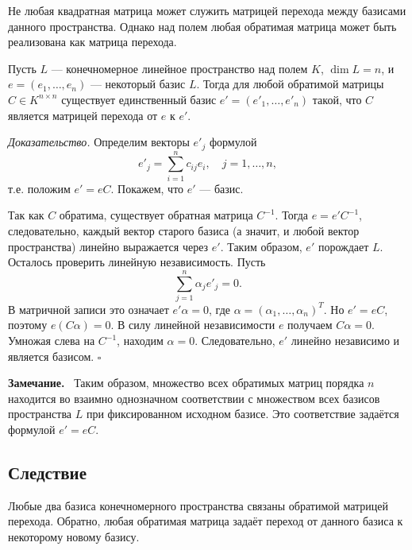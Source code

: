 \documentclass[a4paper,12pt]{article}
\newcommand{\myremark}{\textbf{Замечание.}\ }
\theoremstyle{definition}
\theoremstyle{plain}
\theoremstyle{remark}
\begin{document}
	Не любая квадратная матрица может служить матрицей перехода между базисами данного пространства. Однако над полем любая обратимая матрица может быть реализована как матрица перехода.
	
	\begin{tcolorbox}[colback=red!5, colframe=red!50!black, title=Теорема]
		Пусть \( L \) — конечномерное линейное пространство над полем \( K \), \( \dim L = n \), и \( e = (e_1, \dots, e_n) \) — некоторый базис \( L \). Тогда для любой обратимой матрицы \( C \in K^{n \times n} \) существует единственный базис \( e' = (e'_1, \dots, e'_n) \) такой, что \( C \) является матрицей перехода от \( e \) к \( e' \).
	\end{tcolorbox}
	
	\medskip
	\textit{Доказательство.}
	Определим векторы \( e'_j \) формулой
	\[
	e'_j = \sum_{i=1}^n c_{ij} e_i, \quad j = 1, \dots, n,
	\]
	т.е. положим \( e' = e C \). Покажем, что \( e' \) — базис.
	
	Так как \( C \) обратима, существует обратная матрица \( C^{-1} \). Тогда \( e = e' C^{-1} \), следовательно, каждый вектор старого базиса (а значит, и любой вектор пространства) линейно выражается через \( e' \). Таким образом, \( e' \) порождает \( L \). Осталось проверить линейную независимость. Пусть
	\[
	\sum_{j=1}^n \alpha_j e'_j = 0.
	\]
	В матричной записи это означает \( e' \alpha = 0 \), где \( \alpha = (\alpha_1, \dots, \alpha_n)^T \). Но \( e' = e C \), поэтому \( e (C \alpha) = 0 \). В силу линейной независимости \( e \) получаем \( C \alpha = 0 \). Умножая слева на \( C^{-1} \), находим \( \alpha = 0 \). Следовательно, \( e' \) линейно независимо и является базисом. \hfill \(\square\)
	
	\myremark
	Таким образом, множество всех обратимых матриц порядка \( n \) находится во взаимно однозначном соответствии с множеством всех базисов пространства \( L \) при фиксированном исходном базисе. Это соответствие задаётся формулой \( e' = e C \).
	
	\subsection{Следствие}
	
	Любые два базиса конечномерного пространства связаны обратимой матрицей перехода. Обратно, любая обратимая матрица задаёт переход от данного базиса к некоторому новому базису.
	
	
	
	
	
	\newpage
\end{document}
